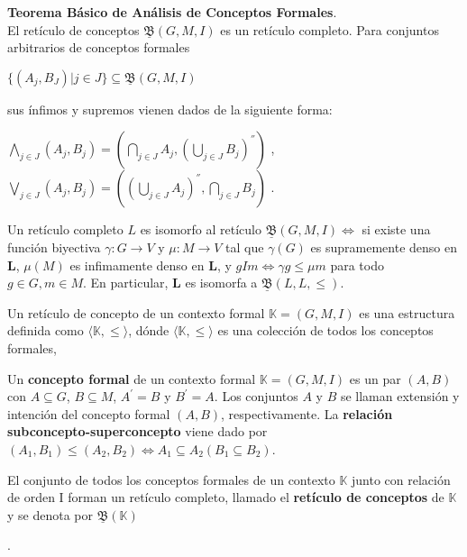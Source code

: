 \documentclass[../../main.tex]{subfiles}
\begin{document}
\begin{teorema}
\textbf{Teorema Básico de Análisis de Conceptos Formales}. \\
El retículo de conceptos $\underline{\mathfrak{B}}(G, M, I)$ es un retículo completo. Para conjuntos arbitrarios de conceptos formales
\begin{center}
    $\{ (A_j, B_J) | j \in J \} \subseteq \underline{\mathfrak{B}}(G, M, I)$ \\
\end{center}
sus ínfimos y supremos vienen dados de la siguiente forma:
\begin{center}

    $\underset{j \in J}{\bigwedge} (A_j, B_j) = (\underset{j \in J}{\bigcap} A_j, (\underset{j \in J}{\bigcup} B_j)^{''}) $ , \\
    $\underset{j \in J}{\bigvee} (A_j, B_j) = ((\underset{j \in J}{\bigcup} A_j)^{''}, \underset{j \in J}{\bigcap} B_j) $ . \\
\end{center}
Un retículo completo $L$ es isomorfo al retículo $\underline{\mathfrak{B}}(G, M, I) \Longleftrightarrow$ si existe una función biyectiva $\gamma : G \rightarrow V$ y $\mu : M \rightarrow V$ tal que $\gamma(G)$ es supramemente denso en $\textbf{L}$, $\mu(M)$ es infimamente denso en $\textbf{L}$, y $gIm \Longleftrightarrow \gamma g \leq \mu m$ para todo $g \in G, m \in M$. En particular, $\textbf{L}$ es isomorfa a $\underline{\mathfrak{B}}(L, L, \leq)$.
\end{teorema}



\begin{definicion}
Un retículo de concepto de un contexto formal $\mathbb{K} = (G, M, I)$ es una estructura definida como $\langle \mathbb{K}, \leq \rangle$, dónde $\langle \mathbb{K}, \leq \rangle$ es una colección de todos los conceptos formales, 
\end{definicion}

\begin{definicion}
Un \textbf{concepto formal} de un contexto formal $\mathbb{K} = (G, M, I)$ es un par $(A, B)$ con $A \subseteq G$, $B \subseteq M$, $A^{'} = B$ y $B^{'} = A$. Los conjuntos $A$ y $B$ se llaman extensión y intención del concepto formal $(A,B)$, respectivamente. La \textbf{relación subconcepto-superconcepto} viene dado por $(A_1, B_1) \leq (A_2, B_2) \Longleftrightarrow A_1 \subseteq A_2 (B_1 \subseteq B_2)$.
\end{definicion}


\begin{definicion}
El conjunto de todos los conceptos formales de un contexto $\mathbb{K}$ junto con relación de orden I forman un retículo completo, llamado el \textbf{retículo de conceptos} de $\mathbb{K}$ y se denota por $\underline{\mathfrak{B}}(\mathbb{K})$
\end{definicion}.
\end{document}
